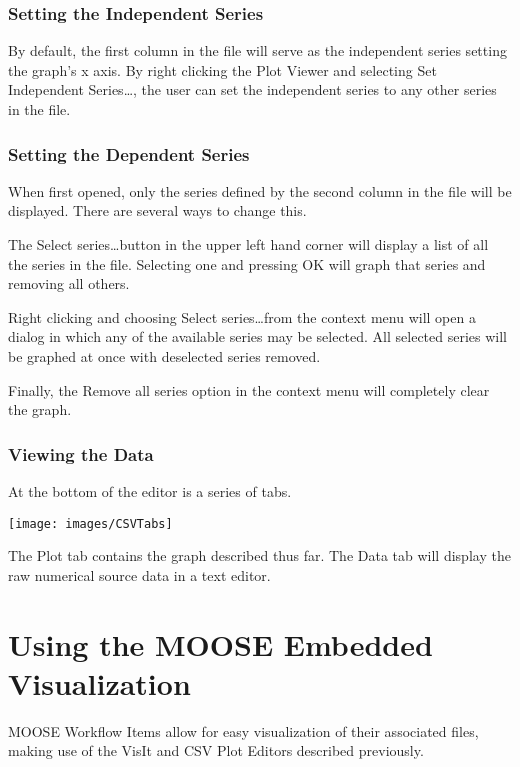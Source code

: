 \subsubsection{Setting the Independent Series}

By default, the first column in the file will serve as the independent series
setting the graph's x axis. By right clicking the Plot Viewer and selecting Set
Independent Series\ldots, the user can set the independent series to any other
series in the file.

\subsubsection{Setting the Dependent Series}

When first opened, only the series defined by the second column in the file will
be displayed. There are several ways to change this. 

The Select series\ldots button in the upper left hand corner will display a list
of all the series in the file. Selecting one and pressing OK will graph that
series and removing all others.

Right clicking and choosing Select series\ldots from the context menu will open
a dialog in which any of the available series may be selected. All selected
series will be graphed at once with deselected series removed.

Finally, the Remove all series option in the context menu will completely clear
the graph.

\subsubsection{Viewing the Data}

At the bottom of the editor is a series of tabs.

\begin{center}
\texttt{[image: images/CSVTabs]}
\end{center}

The Plot tab contains the graph described thus far. The Data tab will display
the raw numerical source data in a text editor. 

\section{Using the MOOSE Embedded Visualization}

MOOSE Workflow Items allow for easy visualization of their associated files,
making use of the VisIt and CSV Plot Editors described previously.

